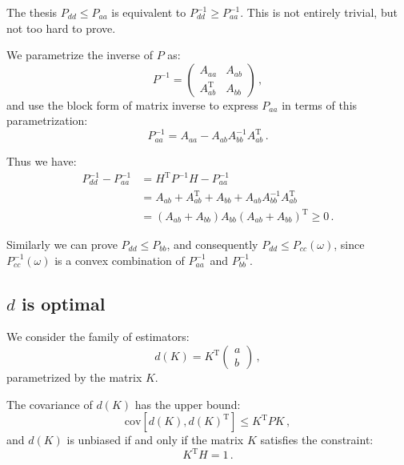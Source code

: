 \documentclass[11pt]{article}
\newcommand{\cov}{\mathrm{cov}}
\newcommand{\transpose}{\mathrm{\scriptscriptstyle T}}
\begin{document}
The thesis $P_{dd} \leq P_{aa}$ is equivalent to $P_{dd}^{-1} \geq
P_{aa}^{-1}$. This is not entirely trivial, but not too hard to prove.

We parametrize the inverse of $P$ as:
\begin{equation}
    P^{-1}=\begin{pmatrix}A_{aa}& A_{ab}\\ A_{ab}^\transpose & A_{bb} \end{pmatrix}\,,
\end{equation}
and use the block form of matrix inverse to express $P_{aa}$ in terms of this
parametrization:
\begin{equation}
    P_{aa}^{-1} = A_{aa} - A_{ab} A_{bb}^{-1} A_{ab}^\transpose\,.
\end{equation}

Thus we have:
\begin{align}
    P_{dd}^{-1} - P_{aa}^{-1} &= H^\transpose P^{-1} H - P_{aa}^{-1} \\
    &= A_{ab} + A_{ab}^\transpose + A_{bb} + A_{ab}A_{bb}^{-1}A_{ab}^\transpose\\
    &=(A_{ab} + A_{bb})A_{bb}(A_{ab} + A_{bb})^\transpose \geq 0\,.
\end{align}

Similarly we can prove $P_{dd} \leq P_{bb}$, and consequently $P_{dd} \leq
P_{cc}(\omega)$, since $P_{cc}^{-1}(\omega)$ is a convex combination of
$P_{aa}^{-1}$ and $P_{bb}^{-1}$.

\subsection{$d$ is optimal}
\label{proof_d_is_optimal}
We consider the family of estimators:
\begin{equation}
d(K) = K^\transpose\begin{pmatrix}a\\b\end{pmatrix}\,,
\end{equation}
parametrized by the matrix $K$.

The covariance of $d(K)$ has the upper bound:
\begin{equation}
    \cov[d(K), d(K)^\transpose] \le K^\transpose P K\,,
\end{equation}
and $d(K)$ is unbiased if and only if the matrix $K$ satisfies the constraint:
\begin{equation}
    K^\transpose H = 1\,.
\end{equation} 
\end{document}
